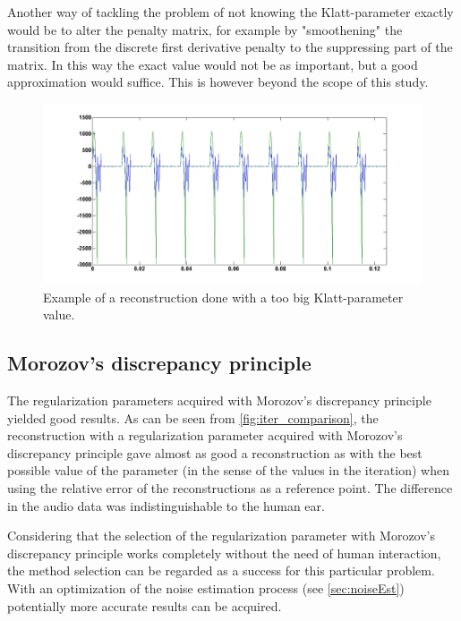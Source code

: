 \documentclass[12pt,a4]{article}
\begin{document}
Another way of tackling the problem of not knowing the Klatt-parameter exactly would be to alter the penalty matrix, for example by "smoothening" the transition from the discrete first derivative penalty to the suppressing part of the matrix. In this way the exact value would not be as important, but a good approximation would suffice. This is however beyond the scope of this study.

\begin{figure}[H]
\begin{center}
\includegraphics[scale=.3]{img/tooBigQ.png}
\end{center}
\caption{Example of a reconstruction done with a too big Klatt-parameter value.}
\label{fig:tooBigQ}
\end{figure}

\subsection{Morozov's discrepancy principle}
\label{sec:morozow}

The regularization parameters acquired with Morozov's discrepancy principle
yielded good results. As can be seen from \cref{fig:iter_comparison}, the reconstruction with a regularization parameter acquired with Morozov's discrepancy principle gave almost as good a reconstruction as with the best possible value of the parameter (in the sense of the values in the iteration) when using the relative error of the reconstructions as a reference point. The difference in the audio data was indistinguishable to the human ear.

Considering that the selection of the regularization parameter with Morozov's discrepancy principle works completely without the need of human interaction, the method selection can be regarded as a success for this particular problem. With an optimization of the noise estimation process (see \ref{sec:noiseEst}) potentially more accurate results can be acquired.
\end{document}
